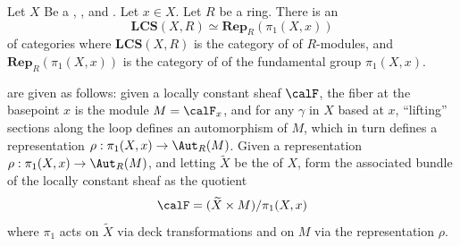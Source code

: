 \begin{theorem}  \label{theorem:loc_const_shvs_of_R_mods_on_a_conn_loc_path_conn_semi_loc_simp_conn_are_eq_to_rep_of_fund_grp}
    Let $X$ Be a , , and . Let $x \in X$. Let $R$ be a ring.
    There is an  
    $$\mathbf{LCS}(X,R) \simeq \mathbf{Rep}_R(\pi_1(X,x))$$
    of categories where $\mathbf{LCS}(X,R)$ is the category of  of $R$-modules, and $\mathbf{Rep}_R(\pi_1(X,x))$ is the category of  of the fundamental group $\pi_1(X,x)$. 

     are given as follows: given a locally constant sheaf $\calF$, the fiber at the basepoint $x$ is the module $M = \calF_x$, and for any  $\gamma$ in $X$ based at $x$, ``lifting'' sections along the loop defines an automorphism of $M$, which in turn defines a representation $\rho: \pi_1(X,x) \to \Aut_R(M)$. Given a representation  $\rho: \pi_1(X,x) \to \Aut_R(M)$, and letting $\widetilde{X}$ be the  of $X$, form the associated bundle of the locally constant sheaf as the quotient
    $$\calF = (\widetilde{X} \times M) / \pi_1(X,x)$$
    where $\pi_1$ acts on $\widetilde{X}$ via deck transformations and on $M$ via the representation $\rho$.
\end{theorem}